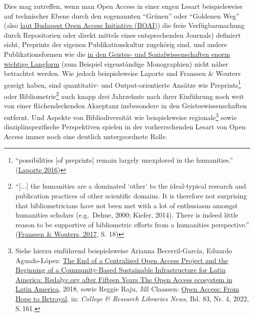 \documentclass[a4paper,
fontsize=11pt,
oneside,
numbers=noperiodatend,
parskip=half-,
bibliography=totoc,
final
]{scrartcl}
\begin{document}
Dies mag zutreffen, wenn man Open Access in einer engen Lesart
beispielsweise auf technischer Ebene durch den sogenannten
\enquote{Grünen} oder \enquote{Goldenen Weg} (also
\href{https://www.budapestopenaccessinitiative.org/boai20/}{laut
Budapest Open Access Initiative (BOAI)}) die freie Verfügbarmachung
durch Repositorien oder direkt mittels eines entsprechenden Journals)
definiert sieht, Preprints der eigenen Publikationskultur zugehörig
sind, und andere Publikationsformen wie die
\href{https://projekt-auroa.de/wp-content/uploads/2022/03/AuROA-Publizieren-und-Open-Access-in-den-Geisteswissenschaften.pdf}{in
den Geistes- und Sozialwissenschaften enorm wichtige Langform} (zum
Beispiel eigenständige Monographien) nicht näher betrachtet werden. Wie
jedoch beispielsweise Laporte und Franssen \& Wouters gezeigt haben,
sind quantitativ- und Output-orientierte Ansätze wie
Preprints\footnote{\enquote{possibilities {[}of preprints{]} remain
  largely unexplored in the humanities.}
  (\href{https://doi.org/10.31235/osf.io/jebhy}{Laporte 2016})} oder
Bibliometrie\footnote{\enquote{{[}...{]} the humanities are a dominated
  \enquote*{other} to the ideal-typical research and publication
  practices of other scientific domains. It is therefore not surprising
  that bibliometricians have not been met with a lot of enthusiasm
  amongst humanities scholars (e.g.~Dehue, 2000; Kiefer, 2014). There is
  indeed little reason to be supportive of bibliometric efforts from a
  humanities perspective.}
  (\href{https://doi.org/10.48550/arXiv.1710.04004}{Franssen \& Wouters,
  2017}, S. 18)} auch knapp drei Jahrzehnte nach ihrer Einführung noch
weit von einer flächendeckenden Akzeptanz insbesondere in den
Geisteswissenschaften entfernt. Und Aspekte von Bibliodiversität wie
beispielsweise regionale\footnote{Siehe hierzu einführend beispielsweise
  Arianna Becerril-García, Eduardo Aguado-López:
  \href{https://dx.doi.org/10.4000/proceedings.elpub.2018.27}{The End of
  a Centralized Open Access Project and the Beginning of a
  Community-Based Sustainable Infrastructure for Latin America:
  Redalyc.org after Fifteen Years The Open Access ecosystem in Latin
  America}, 2018, sowie Reggie Raju, Jill Claassen:
  \href{https://doi.org/10.5860/crln.83.4.161}{Open Access: From Hope to
  Betrayal}, in: \emph{College \& Research Libraries News}, Bd. 83, Nr.
  4, 2022, S.\,161.} sowie disziplinspezifische Perspektiven spielen in
der vorherrschenden Lesart von Open Access immer noch eine deutlich
untergeordnete Rolle.
\end{document}
